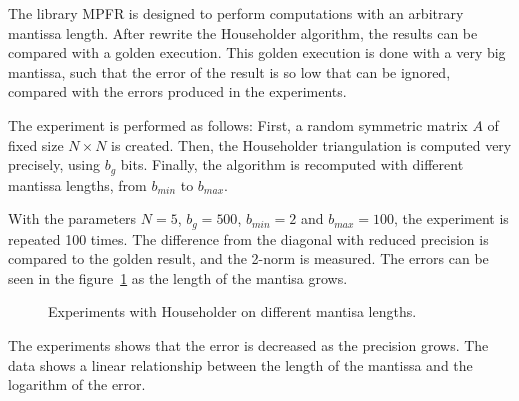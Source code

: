 \documentclass[11pt,a4paper]{article}
\begin{document}
The library MPFR is designed to perform computations with an arbitrary mantissa 
length. After rewrite the Householder algorithm, the results can be compared 
with a golden execution. This golden execution is done with a very big mantissa, 
such that the error of the result is so low that can be ignored, compared with 
the errors produced in the experiments.

The experiment is performed as follows: First, a random symmetric matrix $A$ of 
fixed size $N\times N$ is created. Then, the Householder triangulation is 
computed very precisely, using $b_g$ bits. Finally, the algorithm is recomputed 
with different mantissa lengths, from $b_{min}$ to $b_{max}$.

With the parameters $N = 5$, $b_g=500$, $b_{min} = 2$ and $b_{max}=100$, the 
experiment is repeated 100 times. The difference from the diagonal with reduced 
precision is compared to the golden result, and the 2-norm is measured. The 
errors can be seen in the figure~\ref{fig:errhh} as the length of the mantisa 
grows.

\begin{figure}[h]
	\caption{Experiments with Householder on different mantisa lengths.}
	\label{fig:errhh}
\end{figure}

The experiments shows that the error is decreased as the precision grows. The 
data shows a linear relationship between the length of the mantissa and the 
logarithm of the error.
\end{document}
